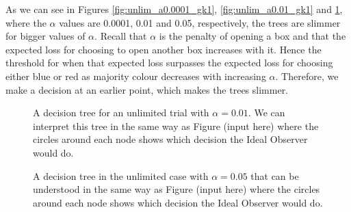 As we can see in Figures \ref{fig:unlim_a0.0001_gk1}, \ref{fig:unlim_a0.01_gk1} and \ref{fig:unlim_a0.05_gk1}, where the $\alpha$ values are 0.0001, 0.01 and 0.05, respectively, the trees are slimmer for bigger values of $\alpha$. Recall that $\alpha$ is the penalty of opening a box and that the expected loss for choosing to open another box increases with it. Hence the threshold for when that expected loss surpasses the expected loss for choosing either blue or red as majority colour decreases with increasing $\alpha$. Therefore, we make a decision at an earlier point, which makes the trees slimmer.
\begin{figure}
    \centering
    \begin{minipage}{0.45\textwidth} 
        \centering
        \scalebox{0.5}{}
        \caption[IO solution, unlimited. $\alpha=0.01$,$\gamma=\kappa=1$]{A decision tree for an unlimited trial with $\alpha = 0.01$. 
        We can interpret this tree in the same way as Figure (input here) where the circles around each node shows which decision the Ideal Observer would do.}
        \label{fig:unlim_a0.01_gk1}
    \end{minipage}\hfill
    \begin{minipage}{0.45\textwidth} 
        \centering
        \scalebox{0.5}{}
        \caption[IO solution, unlimited. $\alpha=0.05$,$\gamma=\kappa=1$]{A decision tree in the unlimited case with $\alpha = 0.05$ that can be understood in the same way as Figure (input here) where the circles around each node shows which decision the Ideal Observer would do.}
        \label{fig:unlim_a0.05_gk1}
    \end{minipage}
\end{figure}



